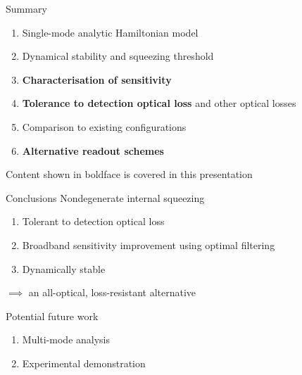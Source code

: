 \documentclass[12pt,xcolor=dvipsnames,aspectratio=169]{beamer}
\newcommand{\vframefill}{\vskip0pt plus 1filll}
\begin{document}
\begin{frame}{Summary}
\begin{enumerate}
\item Single-mode analytic Hamiltonian model
\item Dynamical stability and squeezing threshold %
\item \textbf{Characterisation of sensitivity}
\item \textbf{Tolerance to detection optical loss} and other optical losses
\item Comparison to existing configurations
\item \textbf{Alternative readout schemes}
\end{enumerate}
{\tiny Content shown in boldface is covered in this presentation} 
\end{frame}

\begin{frame}{Conclusions} %
Nondegenerate internal squeezing
\begin{enumerate}
\item Tolerant to detection optical loss
\item Broadband sensitivity improvement using optimal filtering
\item Dynamically stable
\end{enumerate}
$\implies$ an all-optical, loss-resistant alternative %

\vspace*{0.5cm}
Potential future work
\begin{enumerate}
\item Multi-mode analysis
\item Experimental demonstration
\end{enumerate}
\end{frame}

{
\begin{frame}[noframenumbering]
\end{frame}}

\end{document}
